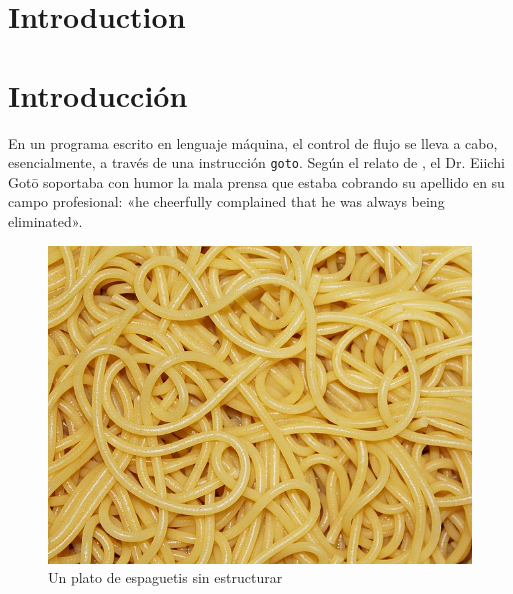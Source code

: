 \documentclass{tfg_domingo}
\begin{document}

\portada
\frontmatter
\gracias{}
\resumen{}{}
\tableofcontents

\mainmatter


\chapter{Introduction}









\chapter{Introducción}

En un programa escrito en lenguaje máquina, el control de
flujo se lleva a cabo, esencialmente, a través de una
instrucción {\tt goto}. Según el relato de
\citet[p. 264]{1974_Knuth}, el Dr. Eiichi Gotō
%
%
soportaba con humor la mala
prensa que estaba cobrando su apellido en su campo
profesional: «he cheerfully complained that he was always
being eliminated».

\begin{figure}[ht!] %
\begin{center}
\includegraphics[width=.7\linewidth]{espaguetis}
\end{center}
\caption{Un plato de espaguetis sin estructurar}
\label{fig_pro}
\end{figure}
\end{document}
